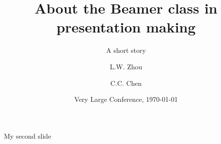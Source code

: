 \documentclass[red]{beamer}
\title[About Beamer]{About the Beamer class in presentation making}
\subtitle{A short story}
\author[Zhou \& Chen] {L.W. Zhou\inst{1} \and C.C. Chen\inst{2}}
\institute[VFU] %
{
  \inst{1}%
  Faculty of Physics\\
  Very Famous University
  \and
  \inst{2}%
  Faculty of Chemistry\\
  Very Famous University
}
\date[VLC 2018]{Very Large Conference, \today}
\begin{document}
\begin{frame}{}
\titlepage
\end{frame}


\begin{frame}{My second slide}

\end{frame}
\end{document}
